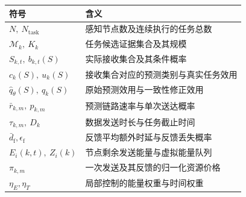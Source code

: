 \begin{table}[t]
  \centering\small
  \label{rq3:tab:notation}
  \begin{tabularx}{\linewidth}{@{}lY@{}}
    \toprule
    符号 & 含义\\
    \midrule
    $N,\ N_{\mathrm{task}}$ & 感知节点数及连续执行的任务总数\\
    $\mathcal{M}_k,\ K_k$ & 任务候选证据集合及其规模\\
    $S_{k,t},\ b_{k,t}(S)$ & 实际接收集合及其条件概率\\
    $c_k(S),\ u_k(S)$ & 接收集合对应的预测类别与真实任务效用\\
    $\hat q_\theta(S),\ q_k(S)$ & 原始预测效用与一致性修正效用\\
    $\bar r_{k,m},\ p_{k,m}$ & 预测链路速率与单次送达概率\\
    $\tau_{k,m},\ D_k$ & 数据发送时长与任务截止时间\\
    $\bar d_{\mathrm f},\epsilon_{\mathrm f}$ & 反馈平均额外时延与反馈丢失概率\\
    $E_i(k,t),\ Z_i(k)$ & 节点剩余发送能量与虚拟能量队列\\
    $\pi_{k,m}$ & 一次发送及其反馈的归一化资源价格\\
    $\eta_E,\eta_T$ & 局部控制的能量权重与时间权重\\
    \bottomrule
  \end{tabularx}
\end{table}
\FloatBarrier